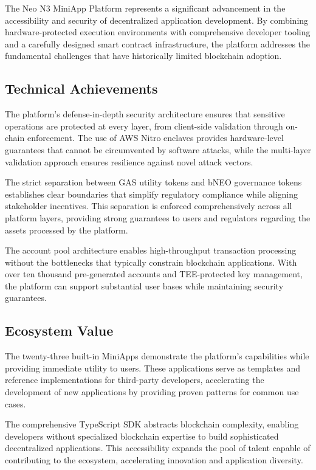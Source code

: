 \documentclass[11pt,a4paper]{article}
\begin{document}
The Neo N3 MiniApp Platform represents a significant advancement in the accessibility and security of decentralized application development. By combining hardware-protected execution environments with comprehensive developer tooling and a carefully designed smart contract infrastructure, the platform addresses the fundamental challenges that have historically limited blockchain adoption.

\subsection{Technical Achievements}

The platform's defense-in-depth security architecture ensures that sensitive operations are protected at every layer, from client-side validation through on-chain enforcement. The use of AWS Nitro enclaves provides hardware-level guarantees that cannot be circumvented by software attacks, while the multi-layer validation approach ensures resilience against novel attack vectors.

The strict separation between GAS utility tokens and bNEO governance tokens establishes clear boundaries that simplify regulatory compliance while aligning stakeholder incentives. This separation is enforced comprehensively across all platform layers, providing strong guarantees to users and regulators regarding the assets processed by the platform.

The account pool architecture enables high-throughput transaction processing without the bottlenecks that typically constrain blockchain applications. With over ten thousand pre-generated accounts and TEE-protected key management, the platform can support substantial user bases while maintaining security guarantees.

\subsection{Ecosystem Value}

The twenty-three built-in MiniApps demonstrate the platform's capabilities while providing immediate utility to users. These applications serve as templates and reference implementations for third-party developers, accelerating the development of new applications by providing proven patterns for common use cases.

The comprehensive TypeScript SDK abstracts blockchain complexity, enabling developers without specialized blockchain expertise to build sophisticated decentralized applications. This accessibility expands the pool of talent capable of contributing to the ecosystem, accelerating innovation and application diversity.
\end{document}
